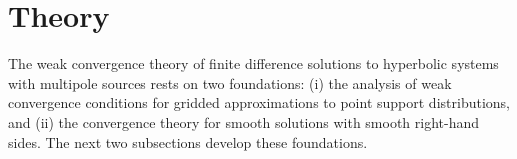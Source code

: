 

\newpage

\section{Theory}

The weak convergence theory of finite difference solutions to hyperbolic
systems with multipole sources rests on two foundations: (i) the
analysis of weak convergence conditions for gridded approximations to
point support distributions, and (ii) the convergence theory for
smooth solutions with smooth right-hand sides. The next two
subsections develop these foundations.


